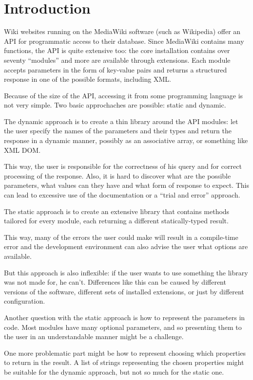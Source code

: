 \chapter*{Introduction}

Wiki websites running on the MediaWiki software (such as Wikipedia) offer an \ac{API}
for programmatic access to their database.
Since MediaWiki contains many functions, the \ac{API} is quite extensive too: the core installation contains over seventy “modules”
and more are available through extensions. Each module accepts parameters in the form of key-value pairs
and returns a structured response in one of the possible formats, including \acs{XML}.

Because of the size of the API, accessing it from some programming language is not very simple.
Two basic approchaches are possible: static and dynamic.

The dynamic approach is to create a thin library around the API modules:
let the user specify the names of the parameters and their types and return the response
in a dynamic manner, possibly as an associative array, or something like \acs{XML} \ac{DOM}.

This way, the user is responsible for the correctness of his query and for correct processing
of the response.
Also, it is hard to discover what are the possible parameters, what values can they have
and what form of response to expect.
This can lead to excessive use of the documentation or a ``trial and error'' approach.

The static approach is to create an extensive library that contains methods tailored for every module,
each returning a different statically-typed result.

This way, many of the errors the user could make will result in a compile-time error
and the development environment can also advise the user what options are available.

But this approach is also inflexible: if the user wants to use something the library
was not made for, he can't.
Differences like this can be caused by different versions of the software,
different sets of installed extensions, or just by different configuration.

Another question with the static approach is how to represent the parameters in code.
Most modules have many optional parameters, and so presenting them to the user
in an understandable manner might be a challenge.

One more problematic part might be how to represent choosing which properties to return in the result.
A list of strings representing the chosen properties might be suitable for the dynamic approach, but not so much for the static one.

